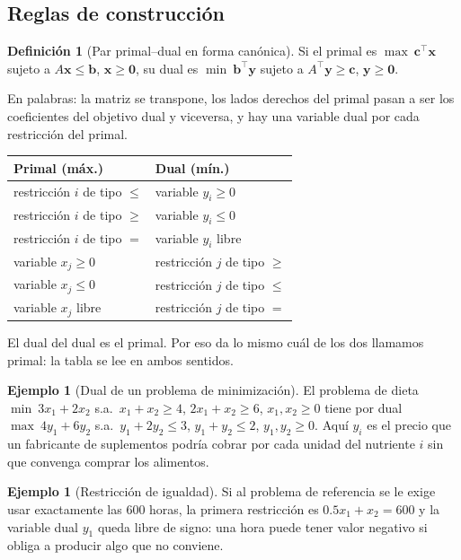 \documentclass[a4paper,11pt]{article}
\theoremstyle{plain}
\theoremstyle{definition}
\newtheorem{definicion}[teorema]{Definición}
\newtheorem{ejemplo}[teorema]{Ejemplo}
\begin{document}
\subsection{Reglas de construcción}

\begin{definicion}[Par primal--dual en forma canónica]
Si el primal es $\max\ \mathbf c^\top\mathbf x$ sujeto a $A\mathbf x\le\mathbf b$, $\mathbf x\ge\mathbf 0$, su dual es
$\min\ \mathbf b^\top\mathbf y$ sujeto a $A^\top\mathbf y\ge\mathbf c$, $\mathbf y\ge\mathbf 0$.
\end{definicion}

En palabras: la matriz se transpone, los lados derechos del primal pasan a ser los coeficientes del objetivo
dual y viceversa, y hay una variable dual por cada restricción del primal.

\begin{center}
\begin{tabular}{@{}ll@{}}\toprule
Primal (máx.) & Dual (mín.)\\\midrule
restricción $i$ de tipo $\le$ & variable $y_i\ge0$\\
restricción $i$ de tipo $\ge$ & variable $y_i\le0$\\
restricción $i$ de tipo $=$ & variable $y_i$ libre\\
variable $x_j\ge0$ & restricción $j$ de tipo $\ge$\\
variable $x_j\le0$ & restricción $j$ de tipo $\le$\\
variable $x_j$ libre & restricción $j$ de tipo $=$\\
\bottomrule
\end{tabular}
\end{center}

\begin{idea}
El dual del dual es el primal. Por eso da lo mismo cuál de los dos llamamos primal: la tabla se lee en
ambos sentidos.
\end{idea}

\begin{ejemplo}[Dual de un problema de minimización]
El problema de dieta $\min\ 3x_1+2x_2$ s.a.\ $x_1+x_2\ge4$, $2x_1+x_2\ge6$, $x_1,x_2\ge0$ tiene por dual
$\max\ 4y_1+6y_2$ s.a.\ $y_1+2y_2\le3$, $y_1+y_2\le2$, $y_1,y_2\ge0$. Aquí $y_i$ es el precio que un
fabricante de suplementos podría cobrar por cada unidad del nutriente $i$ sin que convenga comprar los
alimentos.
\end{ejemplo}

\begin{ejemplo}[Restricción de igualdad]
Si al problema de referencia se le exige usar exactamente las $600$ horas, la primera restricción es
$0.5x_1+x_2=600$ y la variable dual $y_1$ queda libre de signo: una hora puede tener valor negativo si
obliga a producir algo que no conviene.
\end{ejemplo}
\end{document}
